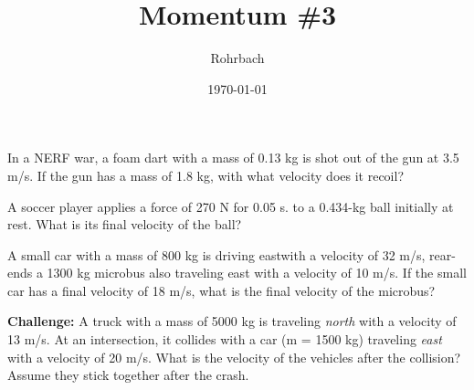 \documentclass[10pt]{exam}
\title{Momentum \#3}
\author{Rohrbach}
\date{\today}
\begin{document}
\maketitle

\begin{questions}
  
  \question
    In a NERF war, a foam dart with a mass of 0.13 kg is shot out of the gun at 3.5 m/s. If the gun has a mass of 1.8 kg, with what velocity does it recoil?
    \vs

  \question
    A soccer player applies a force of 270 N for 0.05 s. to a 0.434-kg ball initially at rest.  What is its final velocity of the ball?
    \vs

  \pagebreak
  
  \question
    A small car with a mass of 800 kg is driving eastwith a velocity of 32 m/s, rear-ends a 1300 kg microbus also traveling east with a velocity of 10 m/s. If the small car has a final velocity of 18 m/s, what is the final velocity of the microbus?
    \vs
    
  \question
    {\bf Challenge:} A truck with a mass of 5000 kg is traveling \emph{north} with a velocity of 13 m/s. At an intersection, it collides with a car (m = 1500 kg) traveling \emph{east} with a velocity of 20 m/s. What is the velocity of the vehicles after the collision?  Assume they stick together after the crash.
    

    \vs
  

\end{questions}
\end{document}

